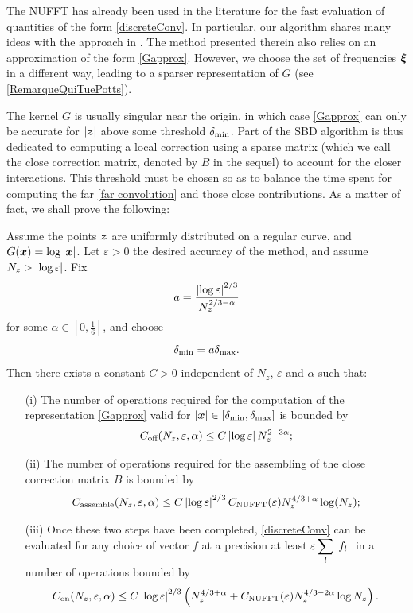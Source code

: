 \documentclass[smallextended]{svjour3}
\begin{document}
The NUFFT has already been used in the literature for the fast evaluation of quantities of the form \eqref{discreteConv}. In particular, our algorithm shares many ideas with the approach in \cite{potts2004fast}. The method presented therein also relies on an approximation of the form \eqref{Gapprox}. However, we choose the set of frequencies $\boldsymbol{\xi}$ in a different way, leading to a sparser representation of $G$ (see \autoref{RemarqueQuiTuePotts}). 

The kernel $G$ is usually singular near the origin, in which case \eqref{Gapprox} can only be accurate for $|\boldsymbol{z}|$ above some threshold $\delta_{\min}$. Part of the SBD algorithm is thus dedicated to computing a local correction using a sparse matrix (which we call the close correction matrix, denoted by $B$ in the sequel) to account for the closer interactions. This threshold must be chosen so as to balance the time spent for computing the far \eqref{far convolution} and those close contributions. As a matter of fact, we shall prove the following:

\begin{theorem} Assume the points $\boldsymbol{z}$ are uniformly distributed on a regular curve, and $G(\boldsymbol{x}) = \log \left\lvert \boldsymbol{x} \right\rvert$. Let $\varepsilon > 0$ the desired accuracy of the method, and assume $N_z > \left\lvert \log{\varepsilon} \right\rvert$. Fix 
	\[a =\dfrac{\left\lvert \log\varepsilon \right\rvert^{2/3}}{N_z^{2/3 - \alpha}}\]
	for some $\alpha \in \left[0,\frac{1}{6}\right]$, and choose 
	\[\delta_{\min} = a \delta_{\max}.\] 
	Then there exists a constant $C>0$ independent of $N_z$, $\varepsilon$ and $\alpha$ such that:
	\label{The:GlobalComplexity}
	\begin{itemize}
		\item[(i)] The number of operations required for the computation of the representation \eqref{Gapprox} valid for $\left\lvert \boldsymbol{x} \right\rvert \in [\delta_{\min},\delta_{\max}]$  is bounded by 
		      \[ C_{\textup{off}}(N_z,\varepsilon,\alpha) \leq C \left\lvert \log \varepsilon \right\rvert N_z^{2 - 3\alpha};\]
		\item[(ii)] The number of operations required for the assembling of the close correction matrix $B$ is bounded by
		      \[C_{\textup{assemble}}(N_z,\varepsilon,\alpha)\leq C \left\lvert \log\varepsilon \right\rvert^{2/3}  C_{\textup{NUFFT}}(\varepsilon) N_z^{4/3 + \alpha}\log(N_z);\]
		\item[(iii)] Once these two steps have been completed, \eqref{discreteConv} can be evaluated for any choice of vector $f$ at a precision at least $\varepsilon \displaystyle\sum_l \left\lvert f_l \right\rvert$ in a number of operations bounded by
		      \[C_{\textup{on}}(N_z,\varepsilon,\alpha) \leq C \left\lvert \log\varepsilon \right\rvert^{2/3} \left(  N_z ^{4/3 + \alpha} + C_{\textup{NUFFT}}(\varepsilon)N_z^{4/3 - 2\alpha}\log N_z \right).\] 
	\end{itemize} 
\end{theorem}
\end{document}
